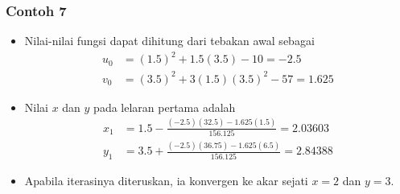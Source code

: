 \documentclass[pdflatex,compress]{beamer}
\begin{document}
\begin{frame}
	\frametitle{Contoh 7}
	\begin{itemize}
		\item Nilai-nilai fungsi dapat dihitung dari tebakan awal sebagai
		\begin{align*}
		u_0 &= (1.5)^2 + 1.5(3.5) - 10 = -2.5 \\
		v_0 &= (3.5)^2 + 3(1.5)(3.5)^2 - 57 = 1.625
		\end{align*}
		\item Nilai $ x $ dan $ y $ pada lelaran pertama adalah
		\begin{align*}
		x_1 &= 1.5 - \frac{(-2.5)(32.5) - 1.625(1.5)}{156.125} = 2.03603 \\
		y_1 &= 3.5 + \frac{(-2.5)(36.75) - 1.625(6.5)}{156.125} = 2.84388
		\end{align*}
		\item Apabila iterasinya diteruskan, ia konvergen ke akar sejati $ x = 2 $ dan $ y = 3 $.
	\end{itemize}
\end{frame}
\end{document}

